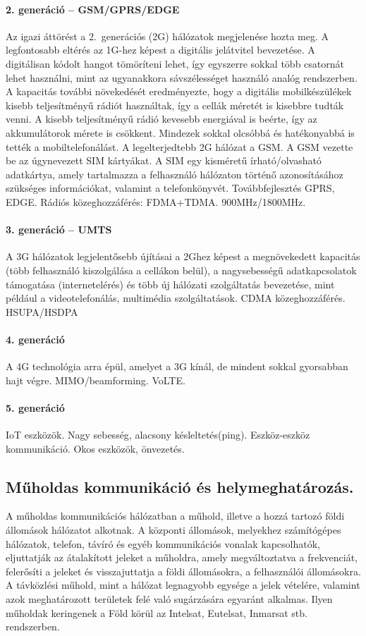 \paragraph{2. generáció -- GSM/GPRS/EDGE}
Az igazi áttörést a 2.~generációs (2G) hálózatok megjelenése hozta meg. A legfontosabb eltérés az 1G-hez képest a digitális jelátvitel bevezetése. A digitálisan kódolt hangot tömöríteni lehet, így egyszerre sokkal több csatornát lehet használni, mint az ugyanakkora sávszélességet használó analóg rendszerben. A kapacitás további növekedését eredményezte, hogy a digitális mobilkészülékek kisebb teljesítményű rádiót használtak, így a cellák méretét is kisebbre tudták venni. A kisebb teljesítményű rádió kevesebb energiával is beérte, így az akkumulátorok mérete is csökkent. Mindezek sokkal olcsóbbá és hatékonyabbá is tették a mobiltelefonálást. A legelterjedtebb 2G hálózat a GSM. A GSM vezette be az úgynevezett SIM kártyákat. A SIM egy kisméretű írható/olvasható adatkártya, amely tartalmazza a felhasználó hálózaton történő azonosításához szükséges információkat, valamint a telefonkönyvét. Továbbfejlesztés GPRS, EDGE. Rádiós közeghozzáférés: FDMA+TDMA. 900MHz/1800MHz.

\paragraph{3. generáció -- UMTS}
A 3G hálózatok legjelentősebb újításai a 2Ghez képest a megnövekedett kapacitás (több felhasználó kiszolgálása a cellákon belül), a nagysebességű adatkapcsolatok támogatása (internetelérés) és több új hálózati szolgáltatás bevezetése, mint például a videotelefonálás, multimédia szolgáltatások. CDMA közeghozzáférés. HSUPA/HSDPA

\paragraph{4. generáció}
A 4G technológia arra épül, amelyet a 3G kínál, de mindent sokkal gyorsabban hajt végre. MIMO/beamforming. VoLTE.

\paragraph{5. generáció}
IoT eszközök. Nagy sebesség, alacsony késleltetés(ping). Eszköz-eszköz kommunikáció. Okos eszközök, önvezetés.

\subsection{Műholdas kommunikáció és helymeghatározás.}
A műholdas kommunikációs hálózatban a műhold, illetve a hozzá tartozó földi
állomások hálózatot alkotnak. A központi állomások, melyekhez számítógépes
hálózatok, telefon, távíró és egyéb kommunikációs vonalak kapcsolhatók,
eljuttatják az átalakított jeleket a műholdra, amely megváltoztatva a frekvenciát, felerősíti a jeleket és visszajuttatja a földi állomásokra, a felhasználói állomásokra. A távközlési műhold, mint a hálózat legnagyobb egysége a jelek vételére, valamint azok meghatározott területek felé való sugárzására egyaránt alkalmas. Ilyen műholdak keringenek a Föld körül az Intelsat, Eutelsat, Inmarsat stb. rendszerben. 

